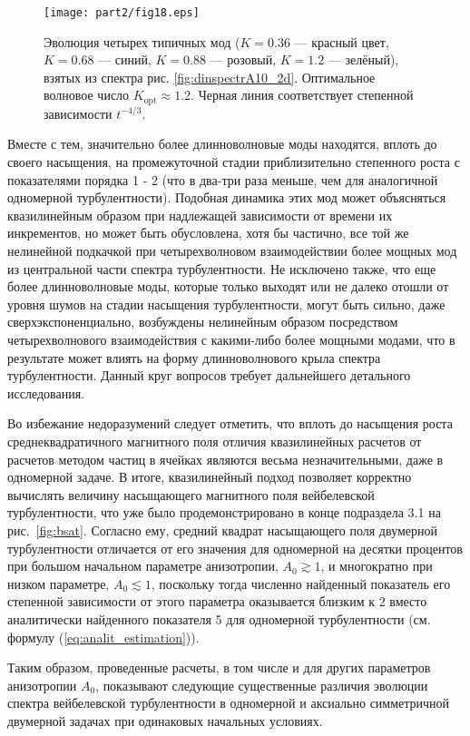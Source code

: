 \begin{figure}[b]
\centering
\texttt{[image: part2/fig18.eps]}
\caption{Эволюция четырех типичных мод ($K=0.36$ --- красный цвет, $K=0.68$ --- синий, $K=0.88$ --- розовый, $K=1.2$ --- зелёный), взятых из спектра рис. \ref{fig:dinspectrA10_2d}. Оптимальное волновое число $K_\mathrm{opt}\approx1.2$. Черная линия соответствует степенной зависимости $t^{-4/3}$.}
\label{fig:evol_garm}
\end{figure}
Вместе с тем, значительно более длинноволновые моды находятся, вплоть до своего насыщения, на промежуточной стадии приблизительно степенного роста с показателями порядка 1 - 2 (что в два-три раза меньше, чем для аналогичной одномерной турбулентности). Подобная динамика этих мод может объясняться квазилинейным образом при надлежащей зависимости от времени их инкрементов, но может быть обусловлена, хотя бы частично, все той же нелинейной подкачкой при четырехволновом взаимодействии более мощных мод из центральной части спектра турбулентности. Не исключено также, что еще более длинноволновые моды, которые только выходят или не далеко отошли от уровня шумов на стадии насыщения турбулентности, могут быть сильно, даже сверхэкспоненциально, возбуждены нелинейным образом посредством четырехволнового взаимодействия с какими-либо более мощными модами, что в результате может влиять на форму длинноволнового крыла спектра турбулентности. Данный круг вопросов требует дальнейшего детального исследования. 

Во избежание недоразумений следует отметить, что вплоть до насыщения роста среднеквадратичного магнитного поля отличия квазилинейных расчетов от расчетов методом частиц в ячейках являются весьма незначительными, даже в одномерной задаче. В итоге, квазилинейный подход позволяет корректно вычислять величину насыщающего магнитного поля вейбелевской турбулентности, что уже было продемонстрировано в конце подраздела 3.1 на рис.~\ref{fig:bsat}. Согласно ему, средний квадрат насыщающего поля двумерной турбулентности отличается от его значения для одномерной на десятки процентов при большом начальном параметре анизотропии, $A_0\gtrsim1$, и многократно при низком параметре, $A_0\lesssim1$, поскольку тогда численно найденный показатель его степенной зависимости от этого параметра оказывается близким к 2 вместо аналитически найденного показателя 5 для одномерной турбулентности (см. формулу (\ref{eq:analit_estimation})). 

Таким образом, проведенные расчеты, в том числе и для других параметров анизотропии $A_0$, показывают следующие существенные различия эволюции спектра вейбелевской турбулентности в одномерной и аксиально симметричной двумерной задачах при одинаковых начальных условиях. 

